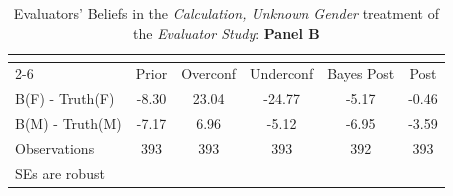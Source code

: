 \begin{table}[htbp]\centering
\caption{Evaluators' Beliefs in the \textit{Calculation, Unknown Gender} treatment of the \textit{Evaluator Study}: \textbf{Panel B}}
\begin{tabular}{l*{5}{c}}
\hline\hline
                &\multicolumn{5}{c}{}                             \\\cmidrule(lr){2-6}
                &\multicolumn{1}{c}{Prior}&\multicolumn{1}{c}{Overconf}&\multicolumn{1}{c}{Underconf}&\multicolumn{1}{c}{Bayes Post}&\multicolumn{1}{c}{Post}\\
\hline
B(F) - Truth(F) &    -8.30&    23.04&   -24.77&    -5.17&    -0.46\\
B(M) - Truth(M) &    -7.17&     6.96&    -5.12&    -6.95&    -3.59\\
\hline
Observations    &      393&      393&      393&      392&      393\\
\hline\hline
\multicolumn{6}{l}{\footnotesize SEs are robust}\\
\end{tabular}
\end{table}
